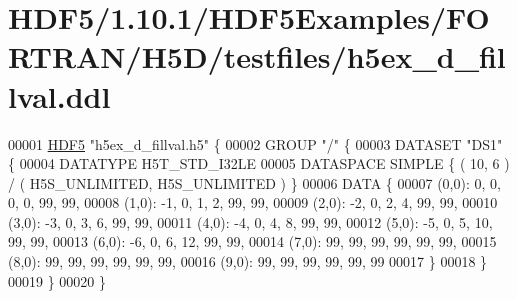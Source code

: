 \hypertarget{_h_d_f5_21_810_81_2_h_d_f5_examples_2_f_o_r_t_r_a_n_2_h5_d_2testfiles_2h5ex__d__fillval_8ddl_source}{}\section{H\+D\+F5/1.10.1/\+H\+D\+F5\+Examples/\+F\+O\+R\+T\+R\+A\+N/\+H5\+D/testfiles/h5ex\+\_\+d\+\_\+fillval.ddl}
\label{_h_d_f5_21_810_81_2_h_d_f5_examples_2_f_o_r_t_r_a_n_2_h5_d_2testfiles_2h5ex__d__fillval_8ddl_source}

\begin{DoxyCode}
00001 \hyperlink{namespace_h_d_f5}{HDF5} \textcolor{stringliteral}{"h5ex\_d\_fillval.h5"} \{
00002 GROUP \textcolor{stringliteral}{"/"} \{
00003    DATASET \textcolor{stringliteral}{"DS1"} \{
00004       DATATYPE  H5T\_STD\_I32LE
00005       DATASPACE  SIMPLE \{ ( 10, 6 ) / ( H5S\_UNLIMITED, H5S\_UNLIMITED ) \}
00006       DATA \{
00007       (0,0): 0, 0, 0, 0, 99, 99,
00008       (1,0): -1, 0, 1, 2, 99, 99,
00009       (2,0): -2, 0, 2, 4, 99, 99,
00010       (3,0): -3, 0, 3, 6, 99, 99,
00011       (4,0): -4, 0, 4, 8, 99, 99,
00012       (5,0): -5, 0, 5, 10, 99, 99,
00013       (6,0): -6, 0, 6, 12, 99, 99,
00014       (7,0): 99, 99, 99, 99, 99, 99,
00015       (8,0): 99, 99, 99, 99, 99, 99,
00016       (9,0): 99, 99, 99, 99, 99, 99
00017       \}
00018    \}
00019 \}
00020 \}
\end{DoxyCode}
